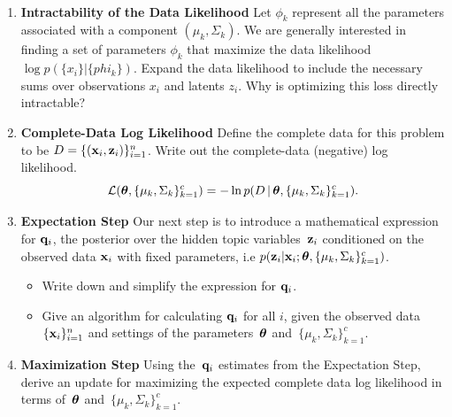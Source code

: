 \documentclass[submit]{harvardml}
\begin{document}
\begin{problem}
  ~

  \begin{enumerate}

  \item \textbf{Intractability of the Data Likelihood} Let $\phi_k$
    represent all the parameters associated with a component
    $(\mu_k,\Sigma_k)$.  We are generally interested in finding a set
    of parameters $\phi_k$ that maximize the data likelihood $\log
    p(\{x_i\}|\{phi_k\})$.  Expand the data likelihood to include the
    necessary sums over observations $x_i$ and latents $z_i$.  Why is
    optimizing this loss directly intractable?
    
\item \textbf{Complete-Data Log Likelihood} Define the complete data for this problem to be $D = \{(\mathbf{x}_i, \mathbf{z}_i)\}_{i=1}^n$. Write out the complete-data (negative) log likelihood. \[\mathcal{L}(\boldsymbol{\theta}, \{\mu_k,\Sigma_k\}^c_{k=1}) =  -\ln p(D \,|\,\boldsymbol{\theta}, \{\mu_k,\Sigma_k\}^c_{k=1}).\] 
    

\item \textbf{Expectation Step}
Our next step is to introduce a mathematical expression for $\mathbf{q}_i$, the posterior over the hidden topic variables~$\mathbf{z}_i$ conditioned on the observed data $\mathbf{x}_i$ with fixed parameters, i.e $p(\mathbf{z}_i | \mathbf{x}_i; \boldsymbol{\theta}, \{ \mu_k,\Sigma_k \}^c_{k=1})$.

\begin{itemize}
\item  Write down and simplify the expression for $\mathbf{q}_i$. 
\item  Give an algorithm for calculating $\mathbf{q}_i$ for all $i$, given the observed data~$\{\mathbf{x}_i\}^n_{i=1}$ and settings of the parameters~$\boldsymbol{\theta}$ and~$\{ \mu_k,\Sigma_k  \}^c_{k=1}$.

\end{itemize}

\item \textbf{Maximization Step}
Using the~$\mathbf{q}_i$ estimates from the Expectation Step, derive an update for maximizing the expected complete data log likelihood in terms of~$\boldsymbol{\theta}$ and~$\{ \mu_k,\Sigma_k \}^c_{k=1}$.


\end{enumerate}
\end{problem}
\end{document}
